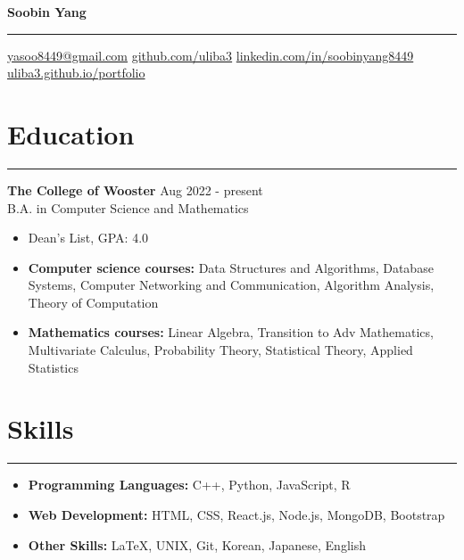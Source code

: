 \documentclass[a4paper,12pt]{article}
\begin{document}
\linespread{1}\selectfont
{}
\newcommand{\sectionrule}[1]{
  \vspace{-15pt}
  \section*{\normalfont #1}
  \vspace{-5pt}
  \hrule
  \vspace{5pt}
}
\pagestyle{empty}

\begin{center}
    \textbf{\LARGE Soobin Yang}
    \vspace{5pt}
    \hrule
    \vspace{5pt}
    \faEnvelope \hspace{1pt} \href{mailto:yasoo8449@gmail.com}{yasoo8449@gmail.com} \hspace{5pt}
    \faGithubSquare \hspace{1pt} \href{https://github.com/uliba3}{github.com/uliba3} \hspace{5pt}
    \faLinkedinSquare \hspace{1pt} \href{https://linkedin.com/in/soobinyang8449}{linkedin.com/in/soobinyang8449} \\
    \faGlobe \hspace{1pt} \href{https://uliba3.github.io/portfolio/}{uliba3.github.io/portfolio}
\end{center}

\sectionrule{Education}
\textbf{The College of Wooster} \hfill \textnormal{Aug 2022 - present}\\
\textnormal{B.A. in Computer Science and Mathematics}
\begin{itemize}
    \item Dean's List, GPA: 4.0
    \item \textbf{Computer science courses:} Data Structures and Algorithms, Database Systems, Computer Networking and Communication, Algorithm Analysis, Theory of Computation
    \item \textbf{Mathematics courses:} Linear Algebra, Transition to Adv Mathematics, Multivariate Calculus, Probability Theory, Statistical Theory, Applied Statistics
\end{itemize}

\sectionrule{Skills}
\begin{itemize}
    \item \textbf{Programming Languages:} C++, Python, JavaScript, R
    \item \textbf{Web Development:} HTML, CSS, React.js, Node.js, MongoDB, Bootstrap
    \item \textbf{Other Skills:} LaTeX, UNIX, Git, Korean, Japanese, English
\end{itemize}
\end{document}

